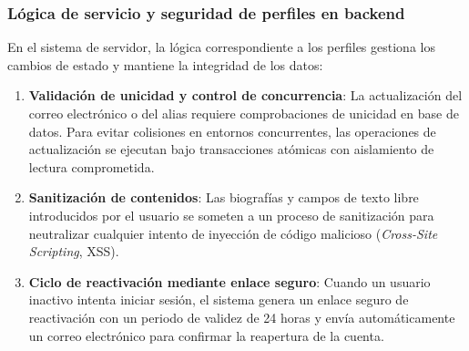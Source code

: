 \subsubsection{Lógica de servicio y seguridad de perfiles en backend}

En el sistema de servidor, la lógica correspondiente a los perfiles gestiona los cambios de estado y mantiene la integridad de los datos:

\begin{enumerate}
    \item \textbf{Validación de unicidad y control de concurrencia}: La actualización del correo electrónico o del alias requiere comprobaciones de unicidad en base de datos. Para evitar colisiones en entornos concurrentes, las operaciones de actualización se ejecutan bajo transacciones atómicas con aislamiento de lectura comprometida.
    \item \textbf{Sanitización de contenidos}: Las biografías y campos de texto libre introducidos por el usuario se someten a un proceso de sanitización para neutralizar cualquier intento de inyección de código malicioso (\emph{Cross-Site Scripting}, XSS).
    \item \textbf{Ciclo de reactivación mediante enlace seguro}: Cuando un usuario inactivo intenta iniciar sesión, el sistema genera un enlace seguro de reactivación con un periodo de validez de 24 horas y envía automáticamente un correo electrónico para confirmar la reapertura de la cuenta.
\end{enumerate}

